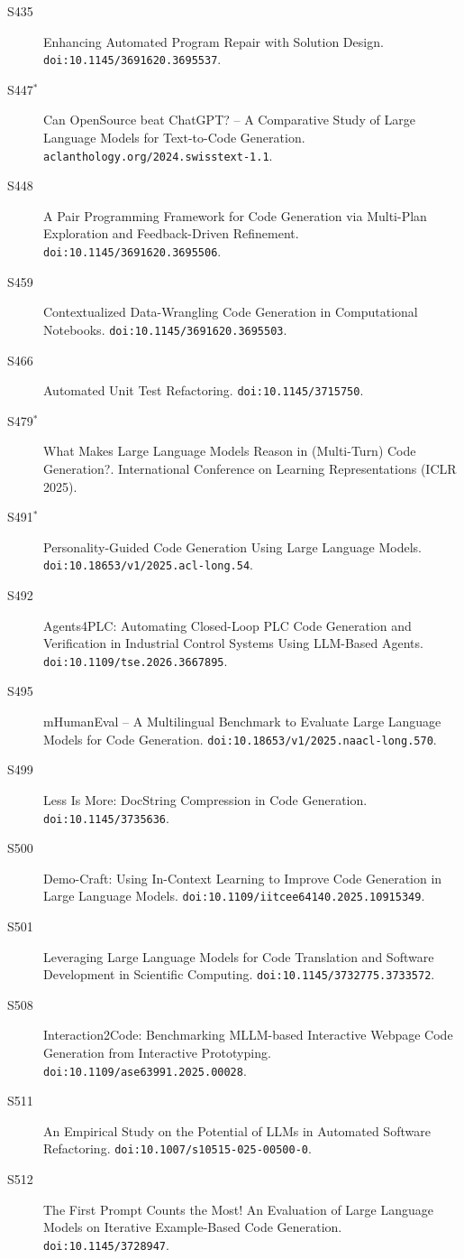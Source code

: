 {\begin{description}
\item[S435] Enhancing Automated Program Repair with Solution Design. \texttt{doi:10.1145/3691620.3695537}.
\item[S447$^\ast$] Can OpenSource beat ChatGPT? -- A Comparative Study of Large Language Models for Text-to-Code Generation. \texttt{aclanthology.org/2024.swisstext-1.1}.
\item[S448] A Pair Programming Framework for Code Generation via Multi-Plan Exploration and Feedback-Driven Refinement. \texttt{doi:10.1145/3691620.3695506}.
\item[S459] Contextualized Data-Wrangling Code Generation in Computational Notebooks. \texttt{doi:10.1145/3691620.3695503}.
\item[S466] Automated Unit Test Refactoring. \texttt{doi:10.1145/3715750}.
\item[S479$^\ast$] What Makes Large Language Models Reason in (Multi-Turn) Code Generation?. International Conference on Learning Representations (ICLR 2025).
\item[S491$^\ast$] Personality-Guided Code Generation Using Large Language Models. \texttt{doi:10.18653/v1/2025.acl-long.54}.
\item[S492] Agents4PLC: Automating Closed-Loop PLC Code Generation and Verification in Industrial Control Systems Using LLM-Based Agents. \texttt{doi:10.1109/tse.2026.3667895}.
\item[S495] mHumanEval -- A Multilingual Benchmark to Evaluate Large Language Models for Code Generation. \texttt{doi:10.18653/v1/2025.naacl-long.570}.
\item[S499] Less Is More: DocString Compression in Code Generation. \texttt{doi:10.1145/3735636}.
\item[S500] Demo-Craft: Using In-Context Learning to Improve Code Generation in Large Language Models. \texttt{doi:10.1109/iitcee64140.2025.10915349}.
\item[S501] Leveraging Large Language Models for Code Translation and Software Development in Scientific Computing. \texttt{doi:10.1145/3732775.3733572}.
\item[S508] Interaction2Code: Benchmarking MLLM-based Interactive Webpage Code Generation from Interactive Prototyping. \texttt{doi:10.1109/ase63991.2025.00028}.
\item[S511] An Empirical Study on the Potential of LLMs in Automated Software Refactoring. \texttt{doi:10.1007/s10515-025-00500-0}.
\item[S512] The First Prompt Counts the Most! An Evaluation of Large Language Models on Iterative Example-Based Code Generation. \texttt{doi:10.1145/3728947}.

\end{description}}
